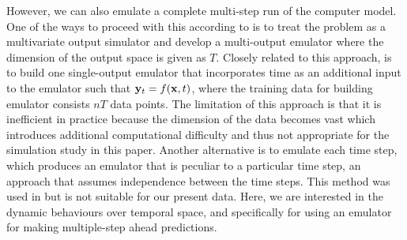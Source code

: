 However, we can also emulate a complete multi-step run of the computer model. One of the ways to proceed with this according to \citet{pd14} is to treat the problem as a multivariate output simulator and develop a multi-output emulator where the dimension of the output space is given as $T$. Closely related to this approach, is to build one single-output emulator that incorporates time as an additional input to the emulator such that ${\bf y}_t = f({\bf x},t)$, where the training data for building emulator consists $nT$ data points. The limitation of this approach is that it is inefficient in practice because the dimension of the data becomes vast which introduces additional computational difficulty and thus not appropriate for the simulation study in this paper. 
Another alternative is to emulate each time step, which produces an emulator that is peculiar to a particular time step, an approach that assumes independence between the time steps. This method was used in \citet{pd27} but is not suitable for our present data. Here, we are interested in the dynamic behaviours over temporal space, and specifically for using an emulator for making multiple-step ahead predictions. 




